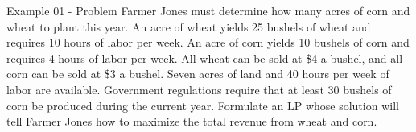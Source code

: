\begin{frame}{Example 01 - Problem}
Farmer Jones must determine how many acres of corn and wheat to plant this year.
An acre of wheat yields 25 bushels of wheat and requires 10 hours of labor per
week. An acre of corn yields 10 bushels of corn and requires 4 hours of labor
per week. All wheat can be sold at \$4 a bushel, and all corn can be sold at
\$3 a bushel. Seven acres of land and 40 hours per week of labor are available.
Government regulations require that at least 30 bushels of corn be produced
during the current year. Formulate an LP whose solution will tell Farmer Jones
how to maximize the total revenue from wheat and corn.
\end{frame}
